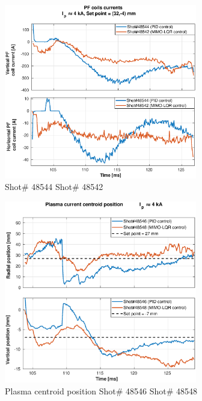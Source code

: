 \begin{figure}
	\centering
	\includegraphics[width=0.75\textwidth]{Chp5/PIDvsMIMO_544_542_curr_2.eps}
	\caption{   Shot\# 48544 Shot\# 48542}
\end{figure}

\begin{figure}
	\centering
	\includegraphics[width=0.75\textwidth]{Chp5/PIDvsMIMO_546_548_2.eps}
	\caption{Plasma centroid position  Shot\# 48546 Shot\# 48548}
\end{figure}

